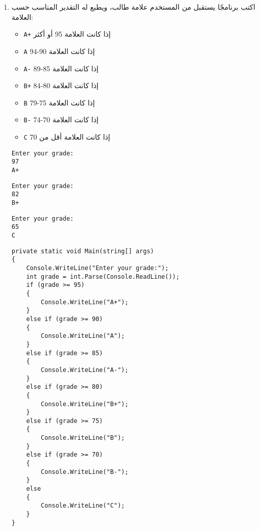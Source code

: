 \documentclass[12pt]{article}
\begin{document}
\begin{enumerate}[itemsep=3em]
\begin{enumerate}
\item
اكتب برنامجًا يستقبل من المستخدم علامة طالب، ويطبع له التقدير المناسب حسب العلامة:
\begin{itemize}
\item \texttt{A+} إذا كانت العلامة 95 أو أكثر
\item \texttt{A} إذا كانت العلامة 90-94
\item \texttt{A-} إذا كانت العلامة 85-89
\item \texttt{B+} إذا كانت العلامة 80-84
\item \texttt{B} إذا كانت العلامة 75-79
\item \texttt{B-} إذا كانت العلامة 70-74
\item \texttt{C} إذا كانت العلامة أقل من 70
\end{itemize}
\ifdetailed
\begin{example}[1]
\begin{english}
\begin{lstlisting}
Enter your grade:
97
A+
\end{lstlisting}
\end{english}
\end{example}
\begin{example}[2]
\begin{english}
\begin{lstlisting}
Enter your grade:
82
B+
\end{lstlisting}
\end{english}
\end{example}
\begin{example}[3]
\begin{english}
\begin{lstlisting}
Enter your grade:
65
C
\end{lstlisting}
\end{english}
\end{example}

\ifwithsols
\begin{solution}
\begin{english}
\begin{lstlisting}
private static void Main(string[] args)
{
    Console.WriteLine("Enter your grade:");
    int grade = int.Parse(Console.ReadLine());
    if (grade >= 95)
    {
        Console.WriteLine("A+");
    }
    else if (grade >= 90)
    {
        Console.WriteLine("A");
    }
    else if (grade >= 85)
    {
        Console.WriteLine("A-");
    }
    else if (grade >= 80)
    {
        Console.WriteLine("B+");
    }
    else if (grade >= 75)
    {
        Console.WriteLine("B");
    }
    else if (grade >= 70)
    {
        Console.WriteLine("B-");
    }
    else
    {
        Console.WriteLine("C");
    }
}
\end{lstlisting}
\end{english}
\end{solution}
\clearpage
\fi
\fi


\end{enumerate}
\end{enumerate}
\end{document}
